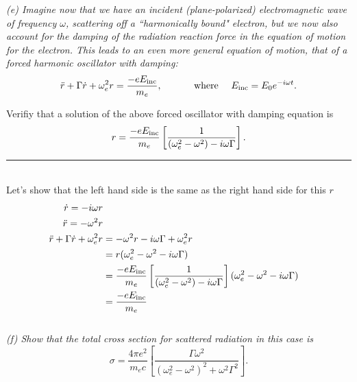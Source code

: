 \documentclass[12pt, letterpaper, twoside]{article}
\newcommand{\answer}[1]{
    \par\noindent\rule{\textwidth}{0.4pt}\\#1\\
}
\begin{document}
\newpage

{\it \noindent (e) Imagine now that we have an incident (plane-polarized)
electromagnetic wave of frequency $\omega$, scattering off a ``harmonically
bound" electron, but we now also account
for the damping of the radiation reaction force in the equation of motion
for the electron. This leads to an even more general equation of motion,
that of a forced harmonic oscillator {\it with damping}:
\begin{equation}
\ddot r + \Gamma \dot r + \omega_e^2 r = \frac{-eE_{\rm inc}}{m_e}, {\rm ~~~~~~~~~~ where~~~~} E_{\rm inc} = E_0 e^{-i\omega t}.
\end{equation}

Verifiy that a solution of the above forced oscillator 
with damping equation is
\begin{equation}
r = \frac{-eE_{\rm inc}}{m_e} \left [ \frac{1}{(\omega_e^2 - \omega^2) - i \omega \Gamma} \right].
\end{equation}}

\answer{
    Let's show that the left hand side is the same as the right hand side for this $r$
    \begin{align}
        \dot{r} = - i \omega r \\
        \ddot{r} = - \omega^2 r \\
        \ddot{r} + \Gamma \dot{r} + \omega_e^2 r &= - \omega^2 r - i \omega \Gamma + \omega_e^2 r \\
        &= r (\omega_e^2 - \omega^2 - i \omega \Gamma) \\
        &= \frac{-eE_{\rm inc}}{m_e} \left [ \frac{1}{(\omega_e^2 - \omega^2) - i \omega \Gamma} \right] (\omega_e^2 - \omega^2 - i \omega \Gamma) \\
        &= \frac{-eE_{\rm inc}}{m_e}
    \end{align}
}

{\it \noindent (f) Show that the total cross section for scattered radiation in this case is 
\begin{equation}
\sigma = \frac{4\pi e^2}{m_e c} \left [ \frac{\Gamma \omega^2}{(\omega_e^2-\omega^2)^2 + \omega^2 \Gamma^2} \right].
\end{equation}}
\end{document}

